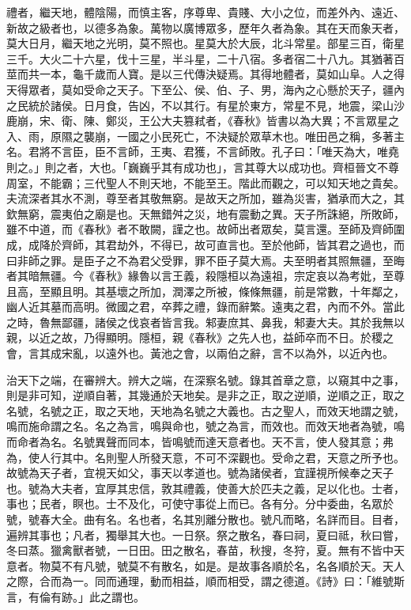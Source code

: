 禮者，繼天地，體陰陽，而慎主客，序尊卑、貴賤、大小之位，而差外內、遠近、新故之級者也，以德多為象。萬物以廣博眾多，歷年久者為象。其在天而象天者，莫大日月，繼天地之光明，莫不照也。星莫大於大辰，北斗常星。部星三百，衛星三千。大火二十六星，伐十三星，半斗星，二十八宿。多者宿二十八九。其猶著百莖而共一本，龜千歲而人寶。是以三代傳決疑焉。其得地體者，莫如山阜。人之得天得眾者，莫如受命之天子。下至公、侯、伯、子、男，海內之心懸於天子，疆內之民統於諸侯。日月食，告凶，不以其行。有星於東方，常星不見，地震，梁山沙鹿崩，宋、衛、陳、鄭災，王公大夫篡弒者，《春秋》皆書以為大異；不言眾星之入、雨，原隰之襲崩，一國之小民死亡，不決疑於眾草木也。唯田邑之稱，多著主名。君將不言臣，臣不言師，王夷、君獲，不言師敗。孔子曰：「唯天為大，唯堯則之。」則之者，大也。「巍巍乎其有成功也」，言其尊大以成功也。齊桓晉文不尊周室，不能霸；三代聖人不則天地，不能至王。階此而觀之，可以知天地之貴矣。夫流深者其水不測，尊至者其敬無窮。是故天之所加，雖為災害，猶承而大之，其欽無窮，震夷伯之廟是也。天無錯舛之災，地有震動之異。天子所誅絕，所敗師，雖不中道，而《春秋》者不敢闕，謹之也。故師出者眾矣，莫言還。至師及齊師圍成，成降於齊師，其君劫外，不得已，故可直言也。至於他師，皆其君之過也，而曰非師之罪。是臣子之不為君父受罪，罪不臣子莫大焉。夫至明者其照無疆，至晦者其暗無疆。今《春秋》緣魯以言王義，殺隱桓以為遠祖，宗定哀以為考妣，至尊且高，至顯且明。其基壞之所加，潤澤之所被，條條無疆，前是常數，十年鄰之，幽人近其墓而高明。微國之君，卒葬之禮，錄而辭繁。遠夷之君，內而不外。當此之時，魯無鄙疆，諸侯之伐哀者皆言我。邾妻庶其、鼻我，邾妻大夫。其於我無以親，以近之故，乃得顯明。隱桓，親《春秋》之先人也，益師卒而不日。於稷之會，言其成宋亂，以遠外也。黃池之會，以兩伯之辭，言不以為外，以近內也。


治天下之端，在審辨大。辨大之端，在深察名號。錄其首章之意，以窺其中之事，則是非可知，逆順自著，其幾通於天地矣。是非之正，取之逆順，逆順之正，取之名號，名號之正，取之天地，天地為名號之大義也。古之聖人，而效天地謂之號，鳴而施命謂之名。名之為言，鳴與命也，號之為言，而效也。而效天地者為號，鳴而命者為名。名號異聲而同本，皆鳴號而達天意者也。天不言，使人發其意；弗為，使人行其中。名則聖人所發天意，不可不深觀也。受命之君，天意之所予也。故號為天子者，宜視天如父，事天以孝道也。號為諸侯者，宜謹視所候奉之天子也。號為大夫者，宜厚其忠信，敦其禮義，使善大於匹夫之義，足以化也。士者，事也；民者，瞑也。士不及化，可使守事從上而已。各有分。分中委曲，名眾於號，號春大全。曲有名。名也者，名其別離分散也。號凡而略，名詳而目。目者，遍辨其事也；凡者，獨舉其大也。一日祭。祭之散名，春曰祠，夏曰祗，秋曰嘗，冬曰蒸。獵禽獸者號，一日田。田之散名，春苗，秋搜，冬狩，夏。無有不皆中天意者。物莫不有凡號，號莫不有散名，如是。是故事各順於名，名各順於天。天人之際，合而為一。同而通理，動而相益，順而相受，謂之德道。《詩》曰：「維號斯言，有倫有跡。」此之謂也。


